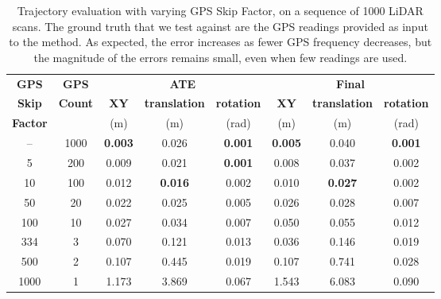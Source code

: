 \begin{table}[h]
    \centering
    {\small
        \begin{tabular}{cc|ccc|ccc}
            \hline
            \textbf{GPS}    & \textbf{GPS}   & \multicolumn{3}{c|}{\textbf{ATE}} & \multicolumn{3}{c}{\textbf{Final}}                                                                                 \\
            \textbf{Skip}   & \textbf{Count} & \textbf{XY}                       & \textbf{translation}               & \textbf{rotation} & \textbf{XY}    & \textbf{translation} & \textbf{rotation} \\
            \textbf{Factor} &                & (m)                               & (m)                                & (rad)             & (m)            & (m)                  & (rad)             \\
            \hline
            \hline
            --              & 1000           & \textbf{0.003}                    & 0.026                              & \textbf{0.001}    & \textbf{0.005} & 0.040                & \textbf{0.001}    \\
            5               & 200            & 0.009                             & 0.021                              & \textbf{0.001}    & 0.008          & 0.037                & 0.002             \\
            10              & 100            & 0.012                             & \textbf{0.016}                     & 0.002             & 0.010          & \textbf{0.027}       & 0.002             \\
            50              & 20             & 0.022                             & 0.025                              & 0.005             & 0.026          & 0.028                & 0.007             \\
            100             & 10             & 0.027                             & 0.034                              & 0.007             & 0.050          & 0.055                & 0.012             \\
            334             & 3              & 0.070                             & 0.121                              & 0.013             & 0.036          & 0.146                & 0.019             \\
            500             & 2              & 0.107                             & 0.445                              & 0.019             & 0.107          & 0.741                & 0.028             \\
            1000            & 1              & 1.173                             & 3.869                              & 0.067             & 1.543          & 6.083                & 0.090             \\
            \hline
        \end{tabular}
    }
    \caption{Trajectory evaluation with varying GPS Skip Factor, on a sequence of 1000 LiDAR scans. The ground truth that we test against are the GPS readings provided as input to the method. As expected, the error increases as fewer GPS frequency decreases, but the magnitude of the errors remains small, even when few readings are used.}
    \label{tab:gps-skip}
\end{table}
